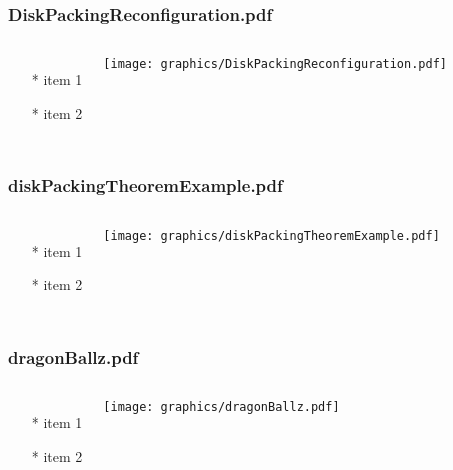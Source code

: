 \documentclass{beamer}
\begin{document}
\begin{frame} \frametitle{DiskPackingReconfiguration.pdf}
    \begin{columns}[c]
        \begin{itemize}
            \item[*] item 1
            \item[*] item 2
        \end{itemize}
        \begin{minipage}{\linewidth}
            \begin{center}
            \texttt{[image: graphics/DiskPackingReconfiguration.pdf]}
            \label{gfx:DiskPackingReconfiguration.pdf}
            \end{center}
        \end{minipage}
    \end{columns}
\end{frame}
\begin{frame} \frametitle{diskPackingTheoremExample.pdf}
    \begin{columns}[c]
        \begin{itemize}
            \item[*] item 1
            \item[*] item 2
        \end{itemize}
        \begin{minipage}{\linewidth}
            \begin{center}
            \texttt{[image: graphics/diskPackingTheoremExample.pdf]}
            \label{gfx:diskPackingTheoremExample.pdf}
            \end{center}
        \end{minipage}
    \end{columns}
\end{frame}
\begin{frame} \frametitle{dragonBallz.pdf}
    \begin{columns}[c]
        \begin{itemize}
            \item[*] item 1
            \item[*] item 2
        \end{itemize}
        \begin{minipage}{\linewidth}
            \begin{center}
            \texttt{[image: graphics/dragonBallz.pdf]}
            \label{gfx:dragonBallz.pdf}
            \end{center}
        \end{minipage}
    \end{columns}
\end{frame}
\end{document}
